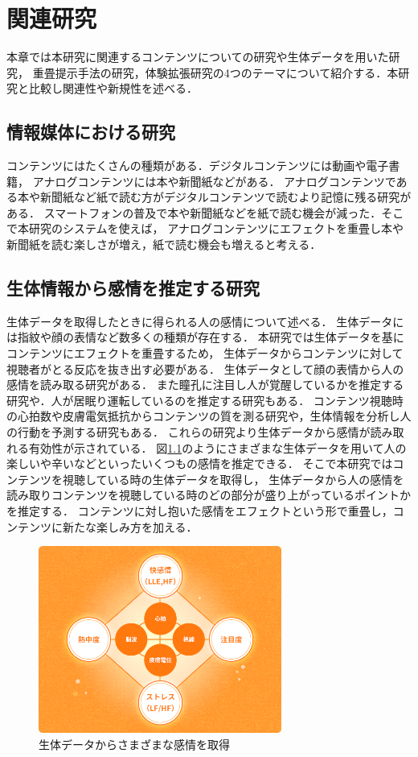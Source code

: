 \thispagestyle{myheadings}
\chapter{関連研究}
本章では本研究に関連するコンテンツについての研究や生体データを用いた研究，
重畳提示手法の研究，体験拡張研究の4つのテーマについて紹介する．本研究と比較し関連性や新規性を述べる．



\section{情報媒体における研究}
コンテンツにはたくさんの種類がある．デジタルコンテンツには動画や電子書籍，
アナログコンテンツには本や新聞紙などがある．
アナログコンテンツである本や新聞紙など紙で読む方がデジタルコンテンツで読むより記憶に残る研究がある\cite{books}．
スマートフォンの普及で本や新聞紙などを紙で読む機会が減った．そこで本研究のシステムを使えば，
アナログコンテンツにエフェクトを重畳し本や新聞紙を読む楽しさが増え，紙で読む機会も増えると考える．

\section{生体情報から感情を推定する研究}

生体データを取得したときに得られる人の感情について述べる．
生体データには指紋や顔の表情など数多くの種類が存在する．
本研究では生体データを基にコンテンツにエフェクトを重畳するため，
生体データからコンテンツに対して視聴者がとる反応を抜き出す必要がある．
生体データとして顔の表情から人の感情を読み取る研究がある\cite{hyoujou,hyoujou2}．
また瞳孔に注目し人が覚醒しているかを推定する研究や．人が居眠り運転しているのを推定する研究もある\cite{doukou}．
コンテンツ視聴時の心拍数や皮膚電気抵抗からコンテンツの質を測る研究\cite{situ}や，生体情報を分析し人の行動を予測する研究\cite{eigo}もある．
これらの研究より生体データから感情が読み取れる有効性が示されている．
図\ref{seitaidata}のようにさまざまな生体データを用いて人の楽しいや辛いなどといったいくつもの感情を推定できる．
そこで本研究ではコンテンツを視聴している時の生体データを取得し，
生体データから人の感情を読み取りコンテンツを視聴している時のどの部分が盛り上がっているポイントかを推定する．
コンテンツに対し抱いた感情をエフェクトという形で重畳し，コンテンツに新たな楽しみ方を加える．

\begin{figure}[H]
    \centering
    \includegraphics[width=8cm]{images/chapter2/heart.png}
    \caption{生体データからさまざまな感情を取得\cite{kanjoutaiken}}
    \label{seitaidata}
\end{figure}



